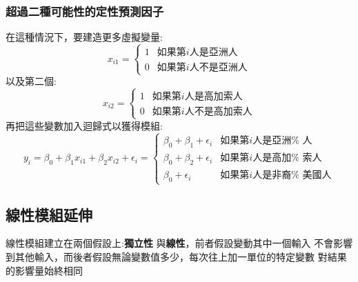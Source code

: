 \documentclass{report} %
\begin{document}
      \subsubsection{超過二種可能性的定性預測因子}
        在這種情況下，要建造更多虛擬變量:
        \begin{equation}
          x_{i1}=
          \left\{
            \begin{array}{ll}
              1 & \mbox{如果第$i$人是亞洲人} \\
          	  0 & \mbox{如果第$i$人不是亞洲人}
            \end{array}
          \right.
        \end{equation}
        以及第二個:
        \begin{equation}
          x_{i2} =
          \left\{
            \begin{array}{ll}
              1 & \mbox{如果第$i$人是高加索人} \\
              0 & \mbox{如果第$i$人不是高加索人}
            \end{array}
          \right.
        \end{equation}
        再把這些變數加入迴歸式以獲得模組:
        \begin{equation}
          y_i = \beta_0 + \beta_1 x_{i1} + \beta_2 x_{i2} +
            \epsilon_i =
          \left\{
            \begin{array}{ll}
              \beta_0 + \beta_1 + \epsilon_i & \mbox{如果第$i$人是亞洲%
                                                 人}\\
              \beta_0 + \beta_2 + \epsilon_i & \mbox{如果第$i$人是高加%
                                                 索人}\\
              \beta_0 + \epsilon_i           & \mbox{如果第$i$人是非裔%
                                                 美國人}
      	    \end{array}
          \right.
   	    \end{equation}
    \subsection{線性模組延伸}
      線性模組建立在兩個假設上:{\bf 獨立性}
        與{\bf 線性}，前者假設變動其中一個輸入
        不會影響到其他輸入，而後者假設無論變數值多少，每次往上加一單位的特定變數
        對結果的影響量始終相同
\end{document}

